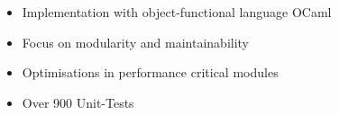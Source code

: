 \begin{itemize}[<+->]
  \item Implementation with object-functional language OCaml
  \item Focus on modularity and maintainability
  \item Optimisations in performance critical modules
  \item Over 900 Unit-Tests
\end{itemize}

